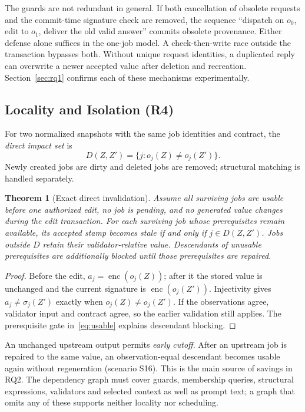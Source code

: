 \documentclass[10pt,journal,compsoc]{IEEEtran}
\theoremstyle{plain}
\newtheorem{theorem}{Theorem}
\theoremstyle{definition}
\newcommand{\Sig}{\sigma}
\begin{document}
The guards are not redundant in general. If both cancellation of obsolete requests and the commit-time signature check are removed, the sequence ``dispatch on $o_0$, edit to $o_1$, deliver the old valid answer'' commits obsolete provenance. Either defense alone suffices in the one-job model. A check-then-write race outside the transaction bypasses both. Without unique request identities, a duplicated reply can overwrite a newer accepted value after deletion and recreation. Section~\ref{sec:rq1} confirms each of these mechanisms experimentally.

\subsection{Locality and Isolation (R4)}
For two normalized snapshots with the same job identities and contract, the \emph{direct impact set} is
\begin{equation}\label{eq:impact}
D(Z,Z')=\{j : o_j(Z)\ne o_j(Z')\}.
\end{equation}
Newly created jobs are dirty and deleted jobs are removed; structural matching is handled separately.

\begin{theorem}[Exact direct invalidation]\label{thm:local}
Assume all surviving jobs are usable before one authorized edit, no job is pending, and no generated value changes during the edit transaction. For each surviving job whose prerequisites remain available, its accepted stamp becomes stale if and only if $j\in D(Z,Z')$. Jobs outside $D$ retain their validator-relative value. Descendants of unusable prerequisites are additionally blocked until those prerequisites are repaired.
\end{theorem}
\begin{proof}
Before the edit, $a_j=\operatorname{enc}(o_j(Z))$; after it the stored value is unchanged and the current signature is $\operatorname{enc}(o_j(Z'))$. Injectivity gives $a_j\ne\Sig_j(Z')$ exactly when $o_j(Z)\ne o_j(Z')$. If the observations agree, validator input and contract agree, so the earlier validation still applies. The prerequisite gate in~\eqref{eq:usable} explains descendant blocking.
\end{proof}

An unchanged upstream output permits \emph{early cutoff}. After an upstream job is repaired to the same value, an observation-equal descendant becomes usable again without regeneration (scenario S16). This is the main source of savings in RQ2. The dependency graph must cover guards, membership queries, structural expressions, validators and selected context as well as prompt text; a graph that omits any of these supports neither locality nor scheduling.
\end{document}
